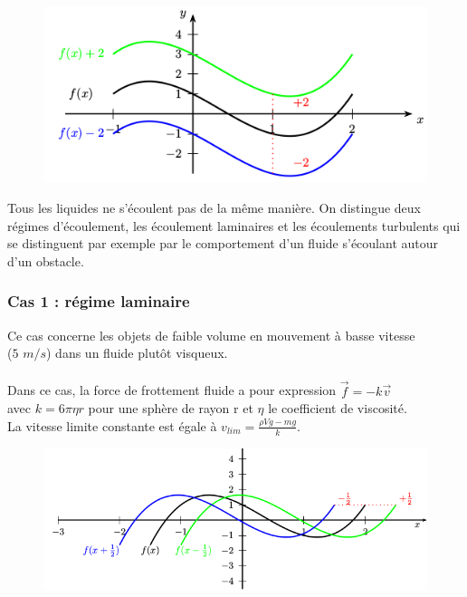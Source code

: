 \documentclass[a4paper,10pt]{book}
\begin{document}
\begin{figure} \includegraphics[scale=0.6]{images/019.png} \end{figure}
Tous les liquides ne s’écoulent pas de la même manière. On distingue deux régimes d’écoulement, les écoulement laminaires et les écoulements turbulents qui se distinguent par exemple par le comportement d’un fluide s’écoulant autour d’un obstacle.


\subsubsection{Cas 1 : régime laminaire}
Ce cas concerne les objets de faible volume en mouvement à basse vitesse\\ ($5$ $m/s$) dans un fluide plutôt visqueux.\\\\
Dans ce cas, la force de frottement fluide a pour expression $\vec{f}=-k\vec{v}$\\
avec $k=6\pi\eta r$ pour une sphère de rayon r et $\eta$ le coefficient de viscosité.\\

La vitesse limite constante est égale à $v_{lim}=\frac{\rho Vg-mg}{k}$.

\begin{figure} \includegraphics[scale=0.6]{images/020.png} \end{figure}
\end{document}
